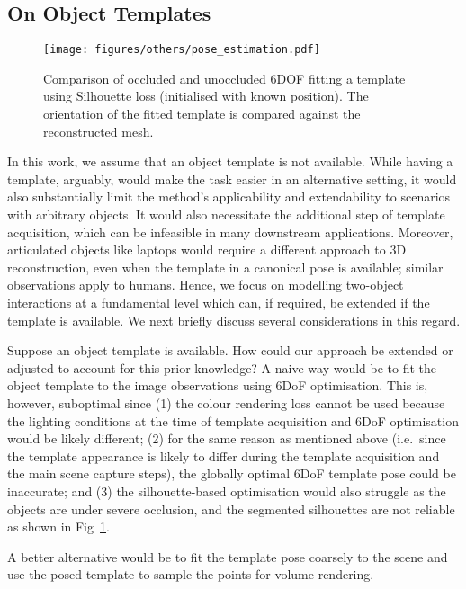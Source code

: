 \subsection{On Object Templates}
\label{sec:object_template_refinement}
\begin{figure}
    \centering
    \texttt{[image: figures/others/pose\_estimation.pdf]}
    \caption{Comparison of occluded and unoccluded 6DOF fitting a template using Silhouette loss (initialised with known position). The orientation of the fitted template is compared against the reconstructed mesh.}
    \vspace{-1em}
    \label{fig:pose_estimation}
\end{figure}
In this work, we assume that an object template is not available. 
While having a template, arguably, would make the task easier in an alternative setting, it would also substantially limit the method's applicability and extendability to scenarios with arbitrary objects. 
It would also necessitate the additional step of template acquisition, which can be infeasible in many downstream applications. 
Moreover, articulated objects like laptops would require a different approach to 3D reconstruction, even when the template in a canonical pose is available; similar observations apply to humans. 
Hence, we focus on modelling two-object interactions at a fundamental level which can, if required, be extended if the template is available. 
We next briefly discuss several considerations in this regard. 
\par
Suppose an object template is available. 
How could our approach be extended or adjusted to account for this prior knowledge? 
A naive way would be to fit the object template to the image observations using 6DoF optimisation. 
This is, however, suboptimal since  
(1) the colour rendering loss cannot be used because the lighting conditions at the time of template acquisition and 6DoF optimisation would be likely different; 
(2) for the same reason as mentioned above (i.e.~since the template appearance is likely to differ during the template acquisition and the main scene capture steps), the globally optimal 6DoF template pose could be inaccurate; and (3) the silhouette-based optimisation would also struggle as the objects are under severe occlusion, and the segmented silhouettes are not reliable as shown in Fig~\ref{fig:pose_estimation}.
\par
A better alternative would be to fit the template pose coarsely to the scene and use the posed template to sample the points for volume rendering. 
